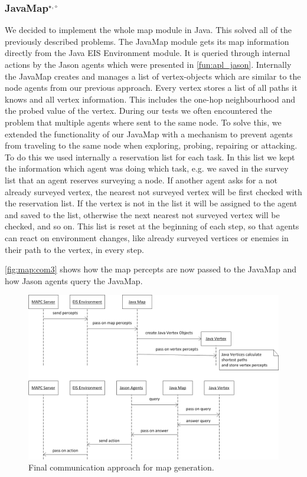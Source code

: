 \subsubsection[JavaMap]{JavaMap$^{\star,\circ}$}\label{alg:map_javamap}
We decided to implement the whole map module in Java.
This solved all of the previously described problems.
The JavaMap module gets its map information directly from the Java EIS Environment module.
It is queried through internal actions by the Jason agents which were presented in \autoref{fun:apl_jason}.
Internally the JavaMap creates and manages a list of vertex-objects which are similar to the node agents from our previous approach.
Every vertex stores a list of all paths it knows and all vertex information.
This includes the one-hop neighbourhood and the probed value of the vertex.
During our tests we often encountered the problem that multiple agents where sent to the same node.
To solve this, we extended the functionality of our JavaMap with a mechanism to prevent agents from traveling to the same node when exploring, probing, repairing or attacking. To do this we used internally a reservation list for each task. In this list we kept the information which agent was doing which task, e.g. we saved in the survey list that an agent reserves surveying a node. If another agent asks for a not already surveyed vertex, the nearest not surveyed vertex will be first checked with the reservation list. If the vertex is not in the list it will be assigned to the agent and saved to the list, otherwise the next nearest not surveyed vertex will be checked, and so on. This list is reset at the beginning of each step, so that agents can react on environment changes, like already surveyed vertices or enemies in their path to the vertex, in every step. 

\autoref{fig:map:com3} shows how the map percepts are now passed to the JavaMap and how Jason agents query the JavaMap.
\begin{figure}
  \centering
  \includegraphics[width=\linewidth]{images/map_com_3.png}
  \caption{Final communication approach for map generation.}
  \label{fig:map:com3}
\end{figure}

